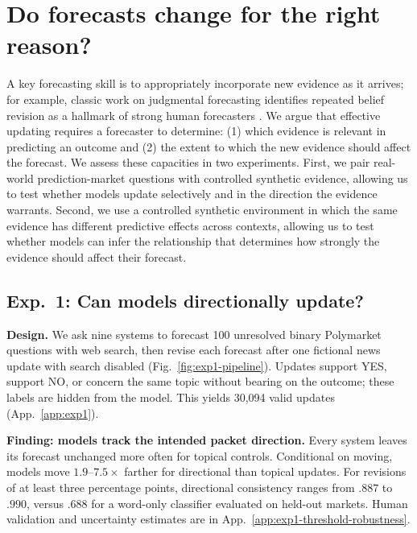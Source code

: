 \documentclass{article}
\begin{document}
\section{Do forecasts change for the right reason?}
\label{sec:evidence}

A key forecasting skill is to appropriately incorporate new evidence as it
arrives; for example, classic work on judgmental forecasting identifies repeated
belief revision as a hallmark of strong human forecasters
\citep{tetlock2005expert}. We argue that effective updating requires a forecaster
to determine: (1) which evidence is relevant in predicting an outcome and (2) the
extent to which the new evidence should affect the forecast. We assess these
capacities in two experiments. First, we pair real-world prediction-market
questions with controlled synthetic evidence, allowing us to test whether models
update selectively and in the direction the evidence warrants. Second, we use a
controlled synthetic environment in which the same evidence has different
predictive effects across contexts, allowing us to test whether models can infer
the relationship that determines how strongly the evidence should affect their
forecast.

\subsection{Exp.~1: Can models directionally update?}
\label{sec:exp1}

\noindent\textbf{Design.}
We ask nine systems to forecast 100 unresolved binary Polymarket questions
with web search, then revise each forecast after one fictional news update with
search disabled (Fig.~\ref{fig:exp1-pipeline}). Updates support YES, support NO,
or concern the same topic without bearing on the outcome; these labels are hidden
from the model. This yields 30,094 valid updates
(App.~\ref{app:exp1}).

\noindent\textbf{Finding: models track the intended packet direction.}
Every system leaves its forecast unchanged more often for topical controls.
Conditional on moving, models move $1.9$--$7.5\times$ farther for directional
than topical updates. For revisions of at least three percentage points,
directional consistency ranges from $.887$ to $.990$, versus $.688$ for a
word-only classifier evaluated on held-out markets. Human validation and
uncertainty estimates are in App.~\ref{app:exp1-threshold-robustness}.
\end{document}

